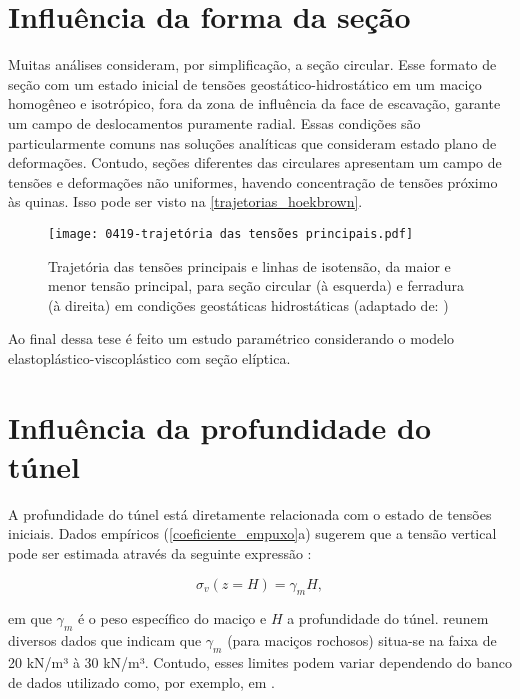 \section{Influência da forma da seção}

Muitas análises consideram, por simplificação, a seção circular. Esse formato de seção com um estado inicial de tensões geostático-hidrostático em um maciço homogêneo e isotrópico, fora da zona de influência da face de escavação, garante um campo de deslocamentos puramente radial. Essas condições são particularmente comuns nas soluções analíticas que consideram estado plano de deformações. Contudo, seções diferentes das circulares apresentam um campo de tensões e deformações não uniformes, havendo concentração de tensões próximo às quinas. Isso pode ser visto na \autoref{trajetorias_hoekbrown}.

\begin{figure}[H]
	\begin{center}
		\texttt{[image: 0419-trajetória das tensões principais.pdf]}
	\end{center}
	\caption{\label{trajetorias_hoekbrown}Trajetória das tensões principais e linhas de isotensão, da maior e menor tensão principal, para seção circular (à esquerda) e ferradura (à direita) em condições geostáticas hidrostáticas (adaptado de: )}
\end{figure}

Ao final dessa tese é feito um estudo paramétrico considerando o modelo elastoplástico-viscoplástico com seção elíptica.

\section{Influência da profundidade do túnel}
\label{cap:Influência da profundidade do túnel}
A profundidade do túnel está diretamente relacionada com o estado de tensões iniciais. Dados empíricos (\autoref{coeficiente_empuxo}a) sugerem que a tensão vertical pode ser estimada através da seguinte expressão \cite[p. 96]{Hoek1980}:

\begin{equation}
	\sigma_v(z=H)= \gamma_m H ,
\end{equation}

em que $\gamma_m$ é o peso específico do maciço e $H$ a profundidade do túnel.  reunem diversos dados que indicam que $\gamma_m$ (para maciços rochosos) situa-se na faixa de 20 kN/m³ à 30 kN/m³. Contudo, esses limites podem variar dependendo do banco de dados utilizado como, por exemplo, em .

